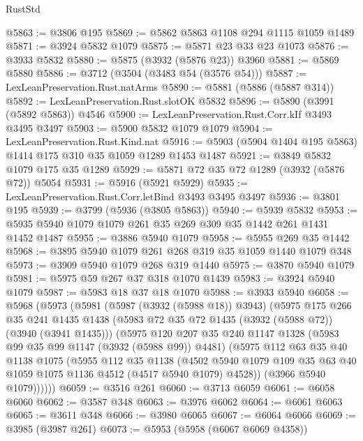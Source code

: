 \begin{lexlean}{RustStd}
\begin{coremodule}
@5863 := @3806 @195
@5869 := @5862 @5863 @1108 @294 @1115 @1059 @1489
@5871 := @3924 @5832 @1079
@5875 := @5871 @23 @33 @23 @1073
@5876 := @3933 @5832
@5880 := @5875 (@3932 (@5876 @23)) @3960
@5881 := @5869 @5880
@5886 := @3712 (@3504 (@3483 @54 (@3576 @54)))
@5887 := LexLeanPreservation.Rust.natArms
@5890 := @5881 (@5886 (@5887 @314))
@5892 := LexLeanPreservation.Rust.slotOK @5832
@5896 := @5890 (@3991 (@5892 @5863)) @4546
@5900 := LexLeanPreservation.Rust.Corr.kIf @3493 @3495 @3497
@5903 := @5900 @5832 @1079 @1079
@5904 := LexLeanPreservation.Rust.Kind.nat
@5916 := @5903 (@5904 @1404 @195 @5863) @1414 @175 @310 @35 @1059 @1289 @1453 @1487
@5921 := @3849 @5832 @1079 @175 @35 @1289
@5929 := @5871 @72 @35 @72 @1289 (@3932 (@5876 @72)) @5054
@5931 := @5916 (@5921 @5929)
@5935 := LexLeanPreservation.Rust.Corr.letBind @3493 @3495 @3497
@5936 := @3801 @195
@5939 := @3799 (@5936 (@3805 @5863))
@5940 := @5939 @5832
@5953 := @5935 @5940 @1079 @1079 @261 @35 @269 @309 @35 @1442 @261 @1431 @1452 @1487
@5955 := @3886 @5940 @1079
@5958 := @5955 @269 @35 @1442
@5968 := @3895 @5940 @1079 @261 @268 @319 @35 @1059 @1440 @1079 @348
@5973 := @3909 @5940 @1079 @268 @319 @1440
@5975 := @3870 @5940 @1079
@5981 := @5975 @59 @267 @37 @318 @1070 @1439
@5983 := @3924 @5940 @1079
@5987 := @5983 @18 @37 @18 @1070
@5988 := @3933 @5940
@6058 := @5968
    (@5973
      (@5981
        (@5987 (@3932 (@5988 @18)) @3943)
        (@5975
          @175
          @266
          @35
          @241
          @1435
          @1438
          (@5983 @72 @35 @72 @1435 (@3932 (@5988 @72)) (@3940 (@3941 @1435)))
          (@5975
            @120
            @207
            @35
            @240
            @1147
            @1328
            (@5983 @99 @35 @99 @1147 (@3932 (@5988 @99)) @4481)
            (@5975
              @112
              @63
              @35
              @40
              @1138
              @1075
              (@5955
                @112
                @35
                @1138
                (@4502
                  @5940
                  @1079
                  @109
                  @35
                  @63
                  @40
                  @1059
                  @1075
                  @1136
                  @4512
                  (@4517 @5940 @1079)
                  @4528))
              (@3966 @5940 @1079))))))
@6059 := @3516 @261
@6060 := @3713 @6059
@6061 := @6058 @6060
@6062 := @3587 @348
@6063 := @3976 @6062
@6064 := @6061 @6063
@6065 := @3611 @348
@6066 := @3980 @6065
@6067 := @6064 @6066
@6069 := @3985 (@3987 @261)
@6073 := @5953 (@5958 (@6067 @6069 @4358))

\end{coremodule}
\end{lexlean}
